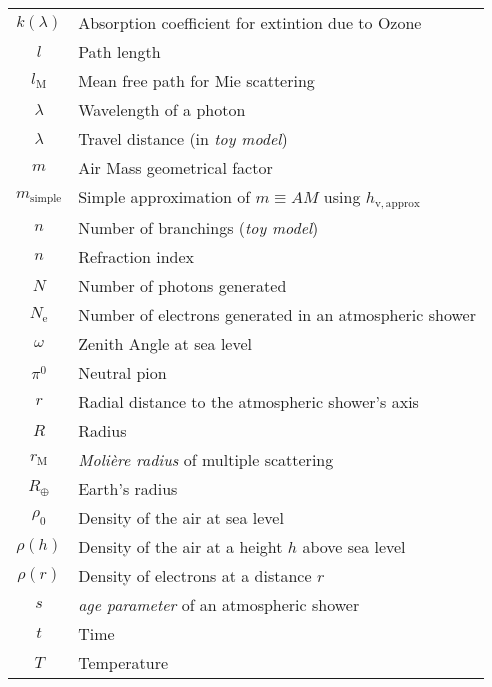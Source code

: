 \begin{longtable}[l]{cl}
$k(\lambda)$                             & Absorption coefficient for extintion due to Ozone \\
$l$                                      & Path length\\
$l_{\mathrm{M}}$                         & Mean free path for Mie scattering\\
$\lambda$                                & Wavelength of a photon \\
$\lambda$                                & Travel distance (in \emph{toy model})\\
$m$                                      & Air Mass geometrical factor\\
$m_{\mathrm{simple}}$                    & Simple approximation of $m\equiv AM$ using $h_{\mathrm{v,approx}}$\\
$n$                                      & Number of branchings (\emph{toy model})\\
$n$                                      & Refraction index \\
$N$                                      & Number of photons generated \\
$N_{\mathrm{e}}$                         & Number of electrons generated in an atmospheric shower\\
$\omega$                                 & Zenith Angle at sea level\\
$\pi^{0}$                                & Neutral pion\\
$r$                                      & Radial distance to the atmospheric shower's axis\\
$R$                                      & Radius\\
$r_{\mathrm{M}}$                         & \emph{Moli\`ere radius} of multiple scattering \\
$R_\oplus$                               & Earth's radius\\
$\rho_0$                                 & Density of the air at sea level\\
$\rho(h)$                                & Density of the air at a height $h$ above sea level\\
$\rho(r)$                                & Density of electrons at a distance $r$\\
$s$                                      & \emph{age parameter} of an atmospheric shower\\
$t$                                      & Time \\
$T$                                      & Temperature \\

\end{longtable}
